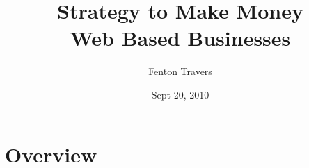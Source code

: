 \documentclass[final,letterpaper,12pt]{article}
\title{
  Strategy to Make Money\\
  Web Based Businesses}
\date{Sept 20, 2010}
\author{Fenton Travers}
\begin{document}
  
\setlength\fboxsep{1pt}
\setlength\fboxrule{0.5pt}
\newpage 
\maketitle
\newpage
\tableofcontents
\newpage
\listoffigures   
\newpage
\section{Overview} 
  
\clearpage
    
\clearpage 

\clearpage

\end{document}
